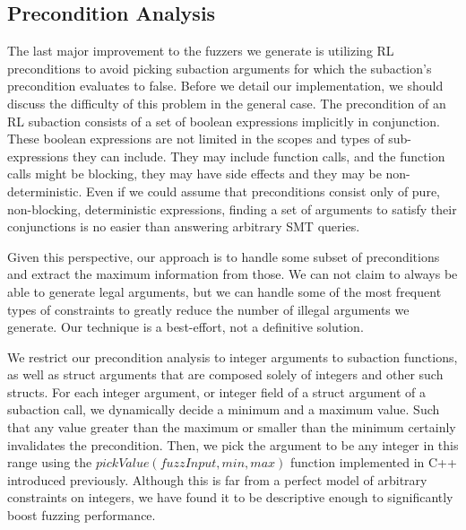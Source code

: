 \subsection{Precondition Analysis} \label{preconditionAnalysis}
The last major improvement to the fuzzers we generate is utilizing RL preconditions to avoid picking subaction arguments for which the subaction's precondition evaluates to false.
Before we detail our implementation, we should discuss the difficulty of this problem in the general case.
The precondition of an RL subaction consists of a set of boolean expressions implicitly in conjunction.
These boolean expressions are not limited in the scopes and types of sub-expressions they can include.
They may include function calls, and the function calls might be blocking, they may have side effects and they may be non-deterministic.
Even if we could assume that preconditions consist only of pure, non-blocking, deterministic expressions, finding a set of arguments to satisfy their conjunctions is no easier than answering arbitrary SMT queries.

Given this perspective, our approach is to handle some subset of preconditions and extract the maximum information from those.
We can not claim to always be able to generate legal arguments, but we can handle some of the most frequent types of constraints to greatly reduce the number of illegal arguments we generate.
Our technique is a best-effort, not a definitive solution.

We restrict our precondition analysis to integer arguments to subaction functions, as well as struct arguments that are composed solely of integers and other such structs.
For each integer argument, or integer field of a struct argument of a subaction call, we dynamically decide a minimum and a maximum value.
Such that any value greater than the maximum or smaller than the minimum certainly invalidates the precondition.
Then, we pick the argument to be any integer in this range using the $pickValue(fuzzInput, min, max)$ function implemented in C++ introduced previously.
Although this is far from a perfect model of arbitrary constraints on integers, we have found it to be descriptive enough to significantly boost fuzzing performance.

